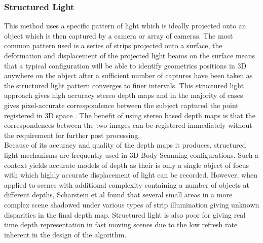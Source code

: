 \subsubsection{Structured Light}

This method uses a specific pattern of light which is ideally projected onto an object which is then captured by a camera or array of cameras. The most common pattern used is a series of strips projected onto a surface, the deformation and displacement of the projected light beams on the surface means that a typical configuration will be able to identify geometrics positions in 3D anywhere on the object after a sufficient number of captures have been taken as the structured light pattern converges to finer intervals. This structured light approach gives high accuracy stereo depth maps and in the majority of cases gives pixel-accurate correspondence between the subject captured the point registered in 3D space \cite{Scharstein2003}. The benefit of using stereo based depth maps is that the correspondences between the two images can be registered immediately without the requirement for further post processing. \\

Because of its accuracy and quality of the depth maps it produces, structured light mechanisms are frequently used in 3D Body Scanning configurations. Such a context yields accurate models of depth as their is only a single object of focus with which highly accurate displacement of light can be recorded. However, when applied to scenes with additional complexity containing a number of objects at different depths, Scharstein et al \cite{Scharstein2003} found that several small areas in a more complex scene shadowed under various types of strip illumination giving unknown disparities in the final depth map. Structured light is also poor for giving real time depth representation in fast moving scenes due to the low refresh rate inherent in the design of the algorithm.

